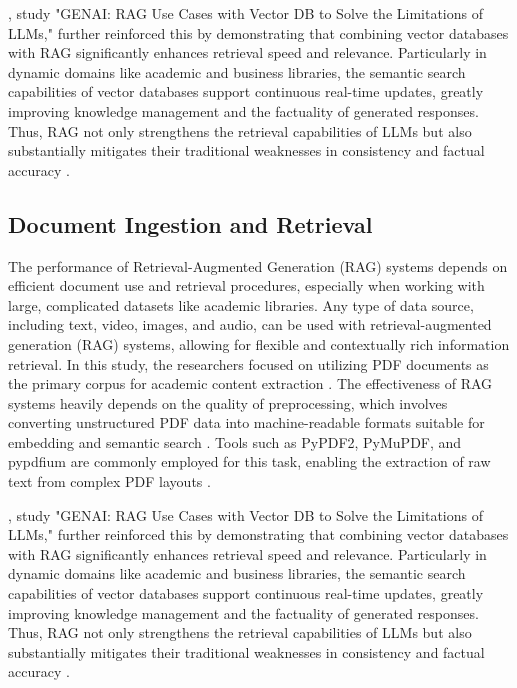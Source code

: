 \begin{refsection}
\bigbreak
\hspace{0.4cm} \citeauthor{sagi2024genai} \citeyear{sagi2024genai}, study "GENAI: RAG Use Cases with Vector DB to Solve the Limitations of LLMs," further reinforced this by demonstrating that combining vector databases with RAG significantly enhances retrieval speed and relevance. Particularly in dynamic domains like academic and business libraries, the semantic search capabilities of vector databases support continuous real-time updates, greatly improving knowledge management and the factuality of generated responses. Thus, RAG not only strengthens the retrieval capabilities of LLMs but also substantially mitigates their traditional weaknesses in consistency and factual accuracy \cite{sagi2024genai}.


\subsection{Document Ingestion and Retrieval}

\hspace{1cm}The performance of Retrieval-Augmented Generation (RAG) systems depends on efficient document use and retrieval procedures, especially when working with large, complicated datasets like academic libraries. Any type of data source, including text, video, images, and audio, can be used with retrieval-augmented generation (RAG) systems, allowing for flexible and contextually rich information retrieval. In this study, the researchers focused on utilizing PDF documents as the primary corpus for academic content extraction \cite{li2023extracting}. 
\newpage
\clearpage
The effectiveness of RAG systems heavily depends on the quality of preprocessing, which involves converting unstructured PDF data into machine-readable formats suitable for embedding and semantic search \cite{arzideh2024miracle} \cite{aquino2024extracting}. Tools such as PyPDF2, PyMuPDF, and pypdfium are commonly employed for this task, enabling the extraction of raw text from complex PDF layouts \cite{adhikari2024comparative}.

\bigbreak
\hspace{0.4cm} \citeauthor{sagi2024genai} \citeyear{sagi2024genai}, study "GENAI: RAG Use Cases with Vector DB to Solve the Limitations of LLMs," further reinforced this by demonstrating that combining vector databases with RAG significantly enhances retrieval speed and relevance. Particularly in dynamic domains like academic and business libraries, the semantic search capabilities of vector databases support continuous real-time updates, greatly improving knowledge management and the factuality of generated responses. Thus, RAG not only strengthens the retrieval capabilities of LLMs but also substantially mitigates their traditional weaknesses in consistency and factual accuracy \cite{sagi2024genai}.


\end{refsection}
